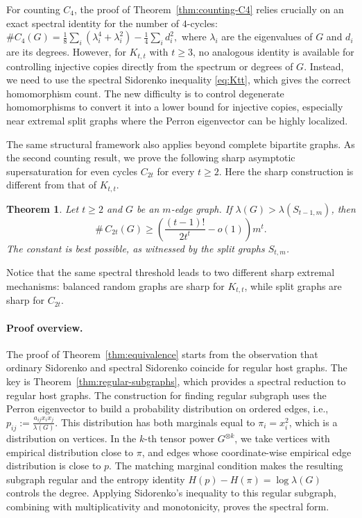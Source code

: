 \documentclass[11pt]{article}
\newtheorem{theorem}{Theorem}[section]
\theoremstyle{definition}
\theoremstyle{plain}
\begin{document}
For counting \(C_4\), the proof of Theorem~\ref{thm:counting-C4} relies crucially on an
exact spectral identity \cite{LL2009} for the number of \(4\)-cycles:  $\texttt{\#}C_4(G)
        =
        \frac18\sum_i(\lambda_i^4+\lambda_i^2)
        -
        \frac14\sum_i d_i^2,$
where \(\lambda_i\) are the eigenvalues of \(G\) and \(d_i\) are its
degrees. However, for \(K_{t,t}\) with \(t\ge3\), no analogous identity is available for controlling injective copies directly from the spectrum or degrees of $G$.  Instead, we need to use the spectral Sidorenko inequality
\eqref{eq:Ktt}, which gives the correct homomorphism count.  The new difficulty is to control degenerate homomorphisms to convert it into a lower bound for injective copies, especially
near extremal split  graphs where the Perron eigenvector can be highly localized.



The same structural framework also applies beyond complete bipartite graphs. As the second counting result, we prove the following sharp asymptotic supersaturation for even cycles $C_{2t}$ for every $t\ge 2$. Here the sharp construction is different from that of $K_{t,t}$. 

\begin{theorem}\label{thm:sharp-C2t}
 Let $t\ge 2$ and $G$ be an $m$-edge graph. If $\lambda(G)> \lambda(S_{t-1,m})$, then
 \[
   \texttt{\#}\, C_{2t}(G) \ge
   \left( \frac{(t-1)!}{2t^t} - o(1)\right) m^t .
 \]
 The constant is best possible, as witnessed by the split graphs $S_{t,m}$.
 \end{theorem}

Notice that the same spectral threshold leads to two different sharp extremal
mechanisms: balanced random graphs are sharp for \(K_{t,t}\), while split
graphs are sharp for \(C_{2t}\).

\paragraph{Proof overview.}

The proof of Theorem~\ref{thm:equivalence} starts from the observation
that ordinary Sidorenko and spectral Sidorenko coincide for regular host
graphs. The key is Theorem~\ref{thm:regular-subgraphs}, which provides a
spectral reduction to regular host graphs.  The construction for finding regular subgraph uses the Perron eigenvector to build a probability
distribution on ordered edges, i.e., 
        $p_{ij}:=\frac{a_{ij}x_ix_j}{\lambda(G)}.$
This distribution has both marginals equal to \(\pi_i=x_i^2\), which is a distribution on vertices. In the $k$-th tensor power \(G^{\otimes k}\), we take vertices with empirical distribution close to \(\pi\), and edges whose coordinate-wise empirical edge distribution is close to \(p\). The
matching marginal condition makes the resulting subgraph regular and the entropy identity \(H(p)-H(\pi)=\log\lambda(G)\) controls the degree. Applying Sidorenko's inequality to this regular subgraph, combining with multiplicativity and monotonicity, proves the spectral form.
\end{document}
